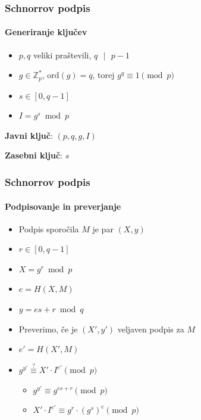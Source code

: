 \documentclass{beamer}    %
\begin{document}
\begin{frame}
    \frametitle{Schnorrov podpis}
    \framesubtitle{Generiranje ključev}
    \begin{itemize}
        \item $p, q$ \alert{veliki} praštevili, $q\text{ }|\text{ }p-1$
        \item $g \in \mathbb{Z}_p^*$, $\text{ord}(g) = q$, torej 
                $g^q \equiv 1 \pmod{p}$
        \item $s \in [0, q-1]$
        \item $I = g^s \bmod{p}$
    \end{itemize}
    \vspace{1cm}
    \begin{multicols*}{2}
        \textbf{Javni ključ}: $(p, q, g, I)$
        \columnbreak

        \textbf{Zasebni ključ}: $s$
    \end{multicols*}
\end{frame}

\begin{frame}
    \frametitle{Schnorrov podpis}
    \framesubtitle{Podpisovanje in preverjanje}
    \begin{itemize}
        \item Podpis sporočila $M$ je par $(X, y)$
        \item $r \in [0, q-1]$
        \item $X = g^r \bmod{p}$
        \item $e = H(X, M)$
        \item $y = es + r \bmod{q}$
    \end{itemize}
    
    \vspace{1cm}
    \begin{itemize}
        \item Preverimo, če je $(X', y')$ veljaven podpis za $M$
        \item $e' = H(X', M)$
        \item $g^{y'} \stackrel{?}{\equiv} X' \cdot I^{e'} \pmod{p}$
            \begin{itemize}
                \item $g^{y'} \equiv g^{es + r} \pmod{p}$
                \item $X' \cdot I^{e'} \equiv g^r \cdot (g^s)^e \pmod{p}$
            \end{itemize}
    \end{itemize}
\end{frame}
\end{document}
